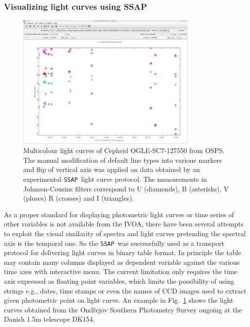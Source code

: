 \documentclass[final,authoryear,5p,times,twocolumn]{elsarticle}
\newcommand{\ssap}{\texttt{SSAP}}
\begin{document}
\subsubsection{Visualizing light curves using SSAP}
%
\begin{figure}[tbh]
\begin{center}
\includegraphics[width=0.8\textwidth]{OGLE-SC7-127550_plot.pdf}
\caption{Multicolour light curves of Cepheid OGLE-SC7-127550 from OSPS. The
manual modification of default line types into various markers and flip of
vertical axis was applied on data obtained by an experimental \ssap\ light
curve protocol.  The measurements in Johnson-Cousins filters correspond to U
(diamonds), B (asterisks), V (pluses) R (crosses) and I (triangles).  }
\label{fig:OGLE-SC7-127550_plot}
\end{center}
\end{figure}

As a proper standard for displaying photometric light curves or time series of
other variables is not available from the IVOA, there have been several
attempts to exploit the visual similarity of spectra and light curves
pretending the spectral axis is the temporal one.  So the \ssap\ was
successfully used as a transport protocol for delivering light curves in binary
table format. In principle the table may contain many columns displayed as
dependent variable against the various time axes with interactive menu.  The
current limitation only requires the time axis expressed as floating point
variables, which limits the possibility of using strings e.g., dates, time
stamps or even the names of CCD images used to extract given photometric point
on light curve.  An example in Fig.~\ref{fig:OGLE-SC7-127550_plot} shows the
light curves obtained from the Ond\v{r}ejov Southern Photometry Survey
\citep{skoda_adassxxiii} ongoing at the Danish 1.5m telescope DK154.
\end{document}
